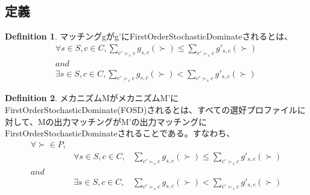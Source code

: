 \documentclass{article}
\theoremstyle{definition}
\newtheorem{definition}{Definition}
\begin{document}
\subsection*{定義}
\begin{definition}
    マッチングgがg’にFirstOrderStochasticDominateされるとは、
    \begin{align*}
        \forall s \in S, c \in C,
        \sum_{c' \succ_s c} g_{s,c}(\succ) \leq \sum_{c' \succ_s c} g'_{s,c}(\succ)\\
        and \\
        \exists s \in S, c \in C,
        \sum_{c' \succ_s c} g_{s,c}(\succ) < \sum_{c' \succ_s c} g'_{s,c}(\succ)
    \end{align*}
\end{definition}
\begin{definition}
    メカニズムMがメカニズムM'にFirstOrderStochasticDominate(FOSD)されるとは、すべての選好プロファイルに対して、Mの出力マッチングがM'の出力マッチングにFirstOrderStochasticDominateされることである。すなわち、
    \begin{equation}
    \begin{aligned}
        \forall \succ \in P,\\
        &\forall s \in S, c \in C,
        &\sum_{c' \succ_s c} g_{s,c}(\succ) \leq \sum_{c' \succ_s c} g'_{s,c}(\succ)\\
        and \\
        &\exists s \in S, c \in C,
        &\sum_{c' \succ_s c} g_{s,c}(\succ) < \sum_{c' \succ_s c} g'_{s,c}(\succ)
    \end{aligned}
    \end{equation}
\end{definition}
\end{document}
